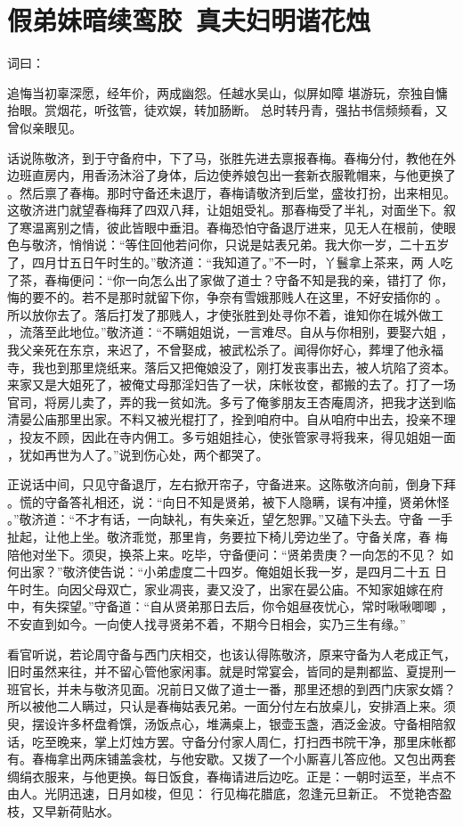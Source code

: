 \chapter{假弟妹暗续鸾胶~真夫妇明谐花烛}

词曰：

追悔当初辜深愿，经年价，两成幽怨。任越水吴山，似屏如障
堪游玩，奈独自慵抬眼。赏烟花，听弦管，徒欢娱，转加肠断。
总时转丹青，强拈书信频频看，又曾似亲眼见。

话说陈敬济，到于守备府中，下了马，张胜先进去禀报春梅。春梅分付，教他在外
边班直房内，用香汤沐浴了身体，后边使养娘包出一套新衣服靴帽来，与他更换了
。然后禀了春梅。那时守备还未退厅，春梅请敬济到后堂，盛妆打扮，出来相见。
这敬济进门就望春梅拜了四双八拜，让姐姐受礼。那春梅受了半礼，对面坐下。叙
了寒温离别之情，彼此皆眼中垂泪。春梅恐怕守备退厅进来，见无人在根前，使眼
色与敬济，悄悄说：“等住回他若问你，只说是姑表兄弟。我大你一岁，二十五岁
了，四月廿五日午时生的。”敬济道：“我知道了。”不一时，丫鬟拿上茶来，两
人吃了茶，春梅便问：“你一向怎么出了家做了道士？守备不知是我的亲，错打了
你，悔的要不的。若不是那时就留下你，争奈有雪娥那贱人在这里，不好安插你的
。所以放你去了。落后打发了那贱人，才使张胜到处寻你不着，谁知你在城外做工
，流落至此地位。”敬济道：“不瞒姐姐说，一言难尽。自从与你相别，要娶六姐
，我父亲死在东京，来迟了，不曾娶成，被武松杀了。闻得你好心，葬埋了他永福
寺，我也到那里烧纸来。落后又把俺娘没了，刚打发丧事出去，被人坑陷了资本。
来家又是大姐死了，被俺丈母那淫妇告了一状，床帐妆奁，都搬的去了。打了一场
官司，将房儿卖了，弄的我一贫如洗。多亏了俺爹朋友王杏庵周济，把我才送到临
清晏公庙那里出家。不料又被光棍打了，拴到咱府中。自从咱府中出去，投亲不理
，投友不顾，因此在寺内佣工。多亏姐姐挂心，使张管家寻将我来，得见姐姐一面
，犹如再世为人了。”说到伤心处，两个都哭了。

正说话中间，只见守备退厅，左右掀开帘子，守备进来。这陈敬济向前，倒身下拜
。慌的守备答礼相还，说：“向日不知是贤弟，被下人隐瞒，误有冲撞，贤弟休怪
。”敬济道：“不才有话，一向缺礼，有失亲近，望乞恕罪。”又磕下头去。守备
一手扯起，让他上坐。敬济乖觉，那里肯，务要拉下椅儿旁边坐了。守备关席，春
梅陪他对坐下。须臾，换茶上来。吃毕，守备便问：“贤弟贵庚？一向怎的不见？
如何出家？”敬济使告说：“小弟虚度二十四岁。俺姐姐长我一岁，是四月二十五
日午时生。向因父母双亡，家业凋丧，妻又没了，出家在晏公庙。不知家姐嫁在府
中，有失探望。”守备道：“自从贤弟那日去后，你令姐昼夜忧心，常时啾啾唧唧
，不安直到如今。一向使人找寻贤弟不着，不期今日相会，实乃三生有缘。”

看官听说，若论周守备与西门庆相交，也该认得陈敬济，原来守备为人老成正气，
旧时虽然来往，并不留心管他家闲事。就是时常宴会，皆同的是荆都监、夏提刑一
班官长，并未与敬济见面。况前日又做了道士一番，那里还想的到西门庆家女婿？
所以被他二人瞒过，只认是春梅姑表兄弟。一面分付左右放桌儿，安排酒上来。须
臾，摆设许多杯盘肴馔，汤饭点心，堆满桌上，银壶玉盏，酒泛金波。守备相陪叙
话，吃至晚来，掌上灯烛方罢。守备分付家人周仁，打扫西书院干净，那里床帐都
有。春梅拿出两床铺盖衾枕，与他安歇。又拨了一个小厮喜儿答应他。又包出两套
绸绢衣服来，与他更换。每日饭食，春梅请进后边吃。正是：一朝时运至，半点不
由人。光阴迅速，日月如梭，但见：
行见梅花腊底，忽逢元旦新正。
不觉艳杏盈枝，又早新荷贴水。


